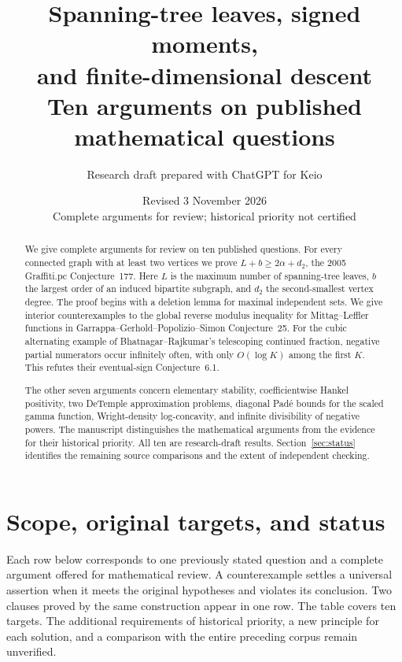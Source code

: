 \documentclass[11pt,a4paper]{article}
\title{Spanning-tree leaves, signed moments,\protect\\and finite-dimensional descent\protect\\[4pt]\large Ten arguments on published mathematical questions}
\author{Research draft prepared with ChatGPT for Keio}
\date{Revised 3 November 2026\protect\\\small Complete arguments for review; historical priority not certified}
\theoremstyle{definition}
\theoremstyle{remark}
\numberwithin{equation}{section}
\begin{document}
\maketitle
\begin{abstract}
We give complete arguments for review on ten published questions.
For every connected graph with at least two vertices we prove
$L+b\ge 2\alpha+d_2$, the 2005 Graffiti.pc Conjecture~177. Here $L$
is the maximum number of spanning-tree leaves, $b$ the largest order
of an induced bipartite subgraph, and $d_2$ the second-smallest vertex
degree. The proof begins with a deletion lemma for maximal independent sets.
We give interior counterexamples to the global reverse modulus inequality
for Mittag--Leffler functions in Garrappa--Gerhold--Popolizio--Simon
Conjecture~25. For the cubic alternating example of
Bhatnagar--Rajkumar's telescoping continued fraction, negative partial
numerators occur infinitely often, with only $O(\log K)$ among the
first $K$. This refutes their eventual-sign Conjecture~6.1.

The other seven arguments concern elementary stability, coefficientwise
Hankel positivity, two DeTemple approximation problems, diagonal
Pad\'e bounds for the scaled gamma function, Wright-density
log-concavity, and infinite divisibility of negative powers.
The manuscript distinguishes the mathematical arguments from the
evidence for their historical priority. All ten are research-draft
results. Section~\ref{sec:status} identifies the remaining source
comparisons and the extent of independent checking.
\end{abstract}

\section{Scope, original targets, and status}

Each row below corresponds to one previously stated question and a complete
argument offered for mathematical review. A counterexample settles a
universal assertion when it meets the original hypotheses and violates
its conclusion. Two clauses proved by the same construction appear
in one row. The table covers ten targets. The additional requirements of
historical priority, a new principle for each solution, and a comparison
with the entire preceding corpus remain unverified.
\end{document}
